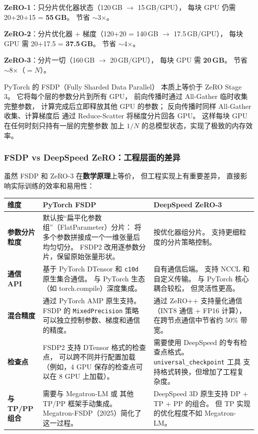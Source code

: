\textbf{ZeRO-1}：只分片优化器状态（120\,GB $\to$ 15\,GB/GPU），
每块 GPU 仍需 20+20+15 = \textbf{55\,GB}。
节省 $\sim$3$\times$。

\textbf{ZeRO-2}：分片优化器 + 梯度（120+20 = 140\,GB $\to$ 17.5\,GB/GPU），
每块 GPU 需 20+17.5 = \textbf{37.5\,GB}。
节省 $\sim$4$\times$。

\textbf{ZeRO-3}：分片一切（160\,GB $\to$ 20\,GB/GPU），
每块 GPU 需 \textbf{20\,GB}。
节省 $\sim$8$\times$（$= N$）。

PyTorch 的 FSDP（Fully Sharded Data Parallel）
本质上等价于 ZeRO Stage 3。
它将每个层的参数分片到所有 GPU，
前向传播时通过 All-Gather 临时收集完整参数，
计算完成后立即释放其他 GPU 的参数；
反向传播时同样 All-Gather 收集、计算梯度后
通过 Reduce-Scatter 将梯度分片回各 GPU。
这样每块 GPU 在任何时刻只持有一层的完整参数
加上 $1/N$ 的总模型状态，实现了极致的内存效率。

\subsubsection{FSDP vs DeepSpeed ZeRO：工程层面的差异}

虽然 FSDP 和 ZeRO-3 在\textbf{数学原理}上等价，
但工程实现上有重要差异，
直接影响实际训练的效率和易用性：

\begin{center}\small
\renewcommand{\arraystretch}{1.3}
\begin{tabular}{p{3cm}p{5.5cm}p{5.5cm}}
\toprule
\rowcolor{figLightGray}
\textbf{维度} & \textbf{PyTorch FSDP} & \textbf{DeepSpeed ZeRO-3} \\
\midrule
\textbf{参数分片粒度} &
  默认按“扁平化参数组”（FlatParameter）分片：
  将多个参数拼接成一个一维张量后均匀切分。
  FSDP2 改用逐参数分片，保留原始张量形状。 &
  按优化器组分片。
  支持更细粒度的分片策略控制。 \\
\textbf{通信 API} &
  基于 PyTorch DTensor 和 \texttt{c10d} 原生集合通信。
  与 PyTorch 生态（如 torch.compile）深度集成。 &
  自有通信后端。
  支持 NCCL 和自定义传输。
  与 PyTorch 核心耦合较松，
  但灵活性更高。 \\
\textbf{混合精度} &
  通过 PyTorch AMP 原生支持。
  FSDP 的 \texttt{MixedPrecision} 策略
  可以独立控制参数、梯度和通信的精度。 &
  通过 ZeRO++ 支持量化通信
  （INT8 通信 + FP16 计算），
  在跨节点通信中节省约 50\% 带宽。 \\
\textbf{检查点} &
  FSDP2 支持 DTensor 格式的检查点，
  可以跨不同并行配置加载
  （例如，4 GPU 保存的检查点可以在 8 GPU 上加载）。 &
  需要使用 DeepSpeed 的专有检查点格式。
  \texttt{universal\_checkpoint} 工具
  支持格式转换，但增加了工程复杂度。 \\
\textbf{与 TP/PP 组合} &
  需要与 Megatron-LM 或
  其他 TP/PP 框架手动集成。
  Megatron-FSDP（2025）简化了这一过程。 &
  DeepSpeed 3D 原生支持
  DP + TP + PP 的组合。
  但 TP 实现的优化程度不如 Megatron-LM。 \\
\bottomrule
\end{tabular}
\end{center}

